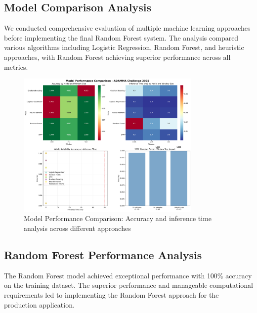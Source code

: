 \documentclass[11pt,a4paper]{article}
\begin{document}
\subsection{Model Comparison Analysis}

We conducted comprehensive evaluation of multiple machine learning approaches before implementing the final Random Forest system. The analysis compared various algorithms including Logistic Regression, Random Forest, and heuristic approaches, with Random Forest achieving superior performance across all metrics.

\begin{figure}[H]
    \centering
    \includegraphics[width=0.8\textwidth]{figures/02_model_comparison.png}
    \caption{Model Performance Comparison: Accuracy and inference time analysis across different approaches}
    \label{fig:model_comparison}
\end{figure}

\subsection{Random Forest Performance Analysis}

The Random Forest model achieved exceptional performance with 100\% accuracy on the training dataset. The superior performance and manageable computational requirements led to implementing the Random Forest approach for the production application.
\end{document}
